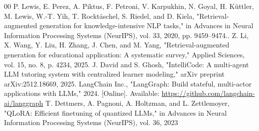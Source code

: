 \documentclass[conference]{IEEEtran}
\begin{document}
{\begin{thebibliography}{00}
 P. Lewis, E. Perez, A. Piktus, F. Petroni, V. Karpukhin, N. Goyal, H. Küttler, M. Lewis, W.-T. Yih, T. Rocktäschel, S. Riedel, and D. Kiela, "Retrieval-augmented generation for knowledge-intensive NLP tasks," in Advances in Neural Information Processing Systems (NeurIPS), vol. 33, 2020, pp. 9459–9474.. 
 Z. Li, X. Wang, Y. Liu, H. Zhang, J. Chen, and M. Yang, "Retrieval-augmented generation for educational application: A systematic survey," Applied Sciences, vol. 15, no. 8, p. 4234, 2025. 
 J. David and S. Ghosh, "IntelliCode: A multi-agent LLM tutoring system with centralized learner modeling," arXiv preprint arXiv:2512.18669, 2025. 
 LangChain Inc., "LangGraph: Build stateful, multi-actor applications with LLMs," 2024. [Online]. Available: \url{https://github.com/langchain-ai/langgraph}
 T. Dettmers, A. Pagnoni, A. Holtzman, and L. Zettlemoyer, "QLoRA: Efficient finetuning of quantized LLMs," in Advances in Neural Information Processing Systems (NeurIPS), vol. 36, 2023
\end{thebibliography}
}
\end{document}
